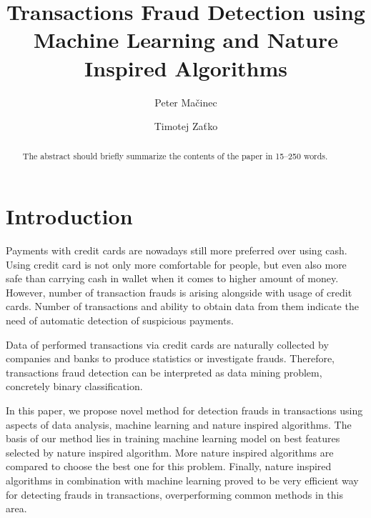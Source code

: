 \documentclass[runningheads]{llncs}
\begin{document}
%
\title{Transactions Fraud Detection using Machine Learning and Nature Inspired Algorithms}
%
%
\author{Peter Mačinec \and Timotej Zaťko}
%
%
%
\maketitle              %
%
\begin{abstract}
The abstract should briefly summarize the contents of the paper in
15--250 words.

\end{abstract}
%
%
%
\section{Introduction}

Payments with credit cards are nowadays still more preferred over using cash. Using credit card is not only more comfortable for people, but even also more safe than carrying cash in wallet when it comes to higher amount of money. However, number of transaction frauds is arising alongside with usage of credit cards. Number of transactions and ability to obtain data from them indicate the need of automatic detection of suspicious payments.

Data of performed transactions via credit cards are naturally collected by companies and banks to produce statistics or investigate frauds. Therefore, transactions fraud detection can be interpreted as data mining problem, concretely binary classification.

In this paper, we propose novel method for detection frauds in transactions using aspects of data analysis, machine learning and nature inspired algorithms. The basis of our method lies in training machine learning model on best features selected by nature inspired algorithm. More nature inspired algorithms are compared to choose the best one for this problem. Finally, nature inspired algorithms in combination with machine learning proved to be very efficient way for detecting frauds in transactions, overperforming common methods in this area.
\end{document}
